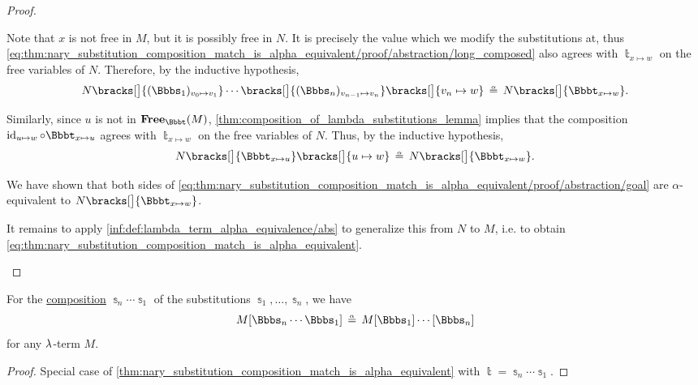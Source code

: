 \begin{proof}
\begin{itemize}
    Note that \( x \) is not free in \( M \), but it is possibly free in \( N \). It is precisely the value which we modify the substitutions at, thus \eqref{eq:thm:nary_substitution_composition_match_is_alpha_equivalent/proof/abstraction/long_composed} also agrees with \( \Bbbt_{x \mapsto w} \) on the free variables of \( N \). Therefore, by the inductive hypothesis,
    \begin{equation*}
      N\bracks[\big]{ (\Bbbs_1)_{v_0 \mapsto v_1} } \cdots \bracks[\big]{ (\Bbbs_n)_{v_{n-1} \mapsto v_n} } \bracks[\big]{ v_n \mapsto w }
      \aequiv
      N\bracks[\big]{ \Bbbt_{x \mapsto w} }.
    \end{equation*}

    Similarly, since \( u \) is not in \( \op*{Free}_\Bbbt(M) \), \cref{thm:composition_of_lambda_substitutions_lemma} implies that the composition \( \id_{u \mapsto w} \bincirc \Bbbt_{x \mapsto u} \) agrees with \( \Bbbt_{x \mapsto w} \) on the free variables of \( N \). Thus, by the inductive hypothesis,
    \begin{equation*}
      N\bracks[\big]{ \Bbbt_{x \mapsto u} }\bracks[\big]{ u \mapsto w }
      \aequiv
      N\bracks[\big]{ \Bbbt_{x \mapsto w} }.
    \end{equation*}

    We have shown that both sides of \eqref{eq:thm:nary_substitution_composition_match_is_alpha_equivalent/proof/abstraction/goal} are \( \alpha \)-equivalent to \( N\bracks[\big]{ \Bbbt_{x \mapsto w} } \).

    It remains to apply \ref{inf:def:lambda_term_alpha_equivalence/abs} to generalize this from \( N \) to \( M \), i.e. to obtain \eqref{eq:thm:nary_substitution_composition_match_is_alpha_equivalent}.
  \end{itemize}
\end{proof}

\begin{corollary}\label{thm:nary_substitution_composition_is_alpha_equivalent}
  For the \hyperref[def:lambda_substitution_composition]{composition} \( \Bbbs_n \cdots \Bbbs_1 \) of the substitutions \( \Bbbs_1, \ldots, \Bbbs_n \), we have
  \begin{equation}\label{eq:thm:nary_substitution_composition_is_alpha_equivalent}
    M[\Bbbs_n \cdots \Bbbs_1] \aequiv M[\Bbbs_1] \cdots [\Bbbs_n]
  \end{equation}
  for any \( {\mathrm \lambda} \)-term \( M \).
\end{corollary}
\begin{proof}
  Special case of \cref{thm:nary_substitution_composition_match_is_alpha_equivalent} with \( \Bbbt = \Bbbs_n \cdots \Bbbs_1 \).
\end{proof}

